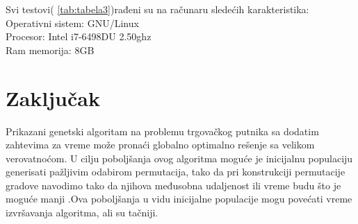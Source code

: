 \documentclass[a4paper]{article}
\begin{document}
Svi testovi( \ref{tab:tabela3})rađeni su na računaru sledećih karakteristika:\\
Operativni sistem: GNU/Linux\\
Procesor: Intel i7-6498DU 2.50ghz\\
Ram memorija: 8GB\\


\section{Zaključak}
Prikazani genetski algoritam na problemu trgovačkog putnika sa dodatim zahtevima za vreme može pronaći globalno optimalno rešenje sa velikom verovatnoćom. U cilju poboljšanja ovog algoritma moguće je inicijalnu populaciju generisati pažljivim odabirom permutacija, tako da pri konstrukciji permutacije gradove navodimo tako da njihova međusobna udaljenost ili vreme budu što je moguće manji \cite{3}.Ova poboljšanja u vidu inicijalne populacije mogu povećati vreme izvršavanja algoritma, ali su tačniji.
\label{sec:zakljucak}

\newpage

\appendix
 


\appendix
\end{document}
